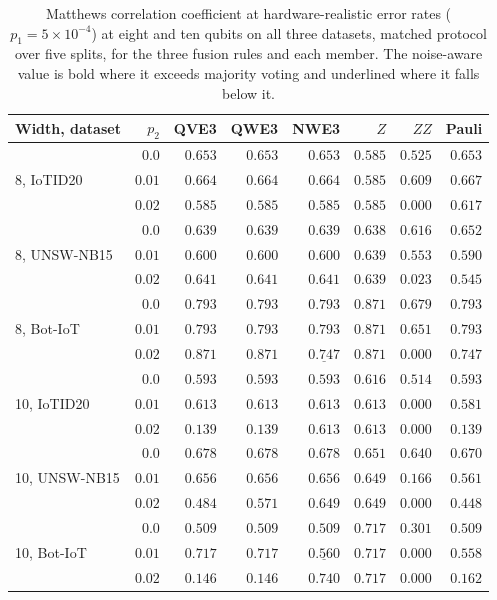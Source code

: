 \begin{table}[t]
\centering
\caption{Matthews correlation coefficient at hardware-realistic error rates
($p_1 = 5\times10^{-4}$) at eight and ten qubits on all three datasets, matched
protocol over five splits, for the three fusion rules and each member. The noise-aware value is bold where it
exceeds majority voting and underlined where it falls below it.}
\label{tab:fusionrealistic}
\begin{tabular}{@{}lrrrrrrr@{}}
\toprule
Width, dataset & $p_2$ & QVE3 & QWE3 & NWE3 & $Z$ & $ZZ$ & Pauli \\
\midrule
\multirow{3}{*}{8, IoTID20}
 & $0.0$ & $0.653$ & $0.653$ & $0.653$ & $0.585$ & $0.525$ & $0.653$ \\
 & $0.01$ & $0.664$ & $0.664$ & $0.664$ & $0.585$ & $0.609$ & $0.667$ \\
 & $0.02$ & $0.585$ & $0.585$ & $0.585$ & $0.585$ & $0.000$ & $0.617$ \\
\midrule
\multirow{3}{*}{8, UNSW-NB15}
 & $0.0$ & $0.639$ & $0.639$ & $0.639$ & $0.638$ & $0.616$ & $0.652$ \\
 & $0.01$ & $0.600$ & $0.600$ & $0.600$ & $0.639$ & $0.553$ & $0.590$ \\
 & $0.02$ & $0.641$ & $0.641$ & $0.641$ & $0.639$ & $0.023$ & $0.545$ \\
\midrule
\multirow{3}{*}{8, Bot-IoT}
 & $0.0$ & $0.793$ & $0.793$ & $0.793$ & $0.871$ & $0.679$ & $0.793$ \\
 & $0.01$ & $0.793$ & $0.793$ & $0.793$ & $0.871$ & $0.651$ & $0.793$ \\
 & $0.02$ & $0.871$ & $0.871$ & $\underline{0.747}$ & $0.871$ & $0.000$ & $0.747$ \\
\midrule
\multirow{3}{*}{10, IoTID20}
 & $0.0$ & $0.593$ & $0.593$ & $0.593$ & $0.616$ & $0.514$ & $0.593$ \\
 & $0.01$ & $0.613$ & $0.613$ & $0.613$ & $0.613$ & $0.000$ & $0.581$ \\
 & $0.02$ & $0.139$ & $0.139$ & $\mathbf{0.613}$ & $0.613$ & $0.000$ & $0.139$ \\
\midrule
\multirow{3}{*}{10, UNSW-NB15}
 & $0.0$ & $0.678$ & $0.678$ & $0.678$ & $0.651$ & $0.640$ & $0.670$ \\
 & $0.01$ & $0.656$ & $0.656$ & $0.656$ & $0.649$ & $0.166$ & $0.561$ \\
 & $0.02$ & $0.484$ & $0.571$ & $\mathbf{0.649}$ & $0.649$ & $0.000$ & $0.448$ \\
\midrule
\multirow{3}{*}{10, Bot-IoT}
 & $0.0$ & $0.509$ & $0.509$ & $0.509$ & $0.717$ & $0.301$ & $0.509$ \\
 & $0.01$ & $0.717$ & $0.717$ & $\underline{0.560}$ & $0.717$ & $0.000$ & $0.558$ \\
 & $0.02$ & $0.146$ & $0.146$ & $\mathbf{0.740}$ & $0.717$ & $0.000$ & $0.162$ \\
\bottomrule
\end{tabular}
\end{table}
